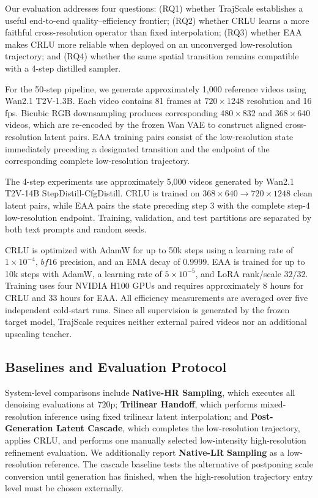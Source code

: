 Our evaluation addresses four questions: (RQ1) whether TrajScale establishes a
useful end-to-end quality--efficiency frontier; (RQ2) whether CRLU learns a more
faithful cross-resolution operator than fixed interpolation; (RQ3) whether EAA
makes CRLU more reliable when deployed on an unconverged low-resolution
trajectory; and (RQ4) whether the same spatial transition remains compatible
with a 4-step distilled sampler.

For the 50-step pipeline, we generate approximately 1,000 reference videos
using Wan2.1 T2V-1.3B. Each video contains 81 frames at
\(720\times1248\) resolution and 16 fps. Bicubic RGB downsampling produces
corresponding \(480\times832\) and \(368\times640\) videos, which are
re-encoded by the frozen Wan VAE to construct aligned cross-resolution latent
pairs. EAA training pairs consist of the low-resolution state immediately
preceding a designated transition and the endpoint of the corresponding
complete low-resolution trajectory.

The 4-step experiments use approximately 5,000 videos generated by Wan2.1
T2V-14B StepDistill-CfgDistill. CRLU is trained on
\(368\times640\rightarrow720\times1248\) clean latent pairs, while EAA pairs
the state preceding step 3 with the complete step-4 low-resolution endpoint.
Training, validation, and test partitions are separated by both text prompts
and random seeds.

CRLU is optimized with AdamW for up to 50k steps using a learning rate of
\(1\times10^{-4}\), \(bf16\) precision, and an EMA decay of 0.9999. EAA is
trained for up to 10k steps with AdamW, a learning rate of
\(5\times10^{-5}\), and LoRA rank/scale \(32/32\). Training uses four NVIDIA
H100 GPUs and requires approximately 8 hours for CRLU and 33 hours for EAA. All
efficiency measurements are averaged over five independent cold-start runs.
Since all supervision is generated by the frozen target model, TrajScale
requires neither external paired videos nor an additional upscaling teacher.

\subsection{Baselines and Evaluation Protocol}
\label{sec:factorialsetup}

System-level comparisons include \textbf{Native-HR Sampling}, which executes
all denoising evaluations at \(720\text{p}\); \textbf{Trilinear Handoff},
which performs mixed-resolution inference using fixed trilinear latent
interpolation; and \textbf{Post-Generation Latent Cascade}, which completes
the low-resolution trajectory, applies CRLU, and performs one manually selected
low-intensity high-resolution refinement evaluation. We additionally report
\textbf{Native-LR Sampling} as a low-resolution reference. The cascade
baseline tests the alternative of postponing scale conversion until generation
has finished, when the high-resolution trajectory entry level must be chosen
externally.

